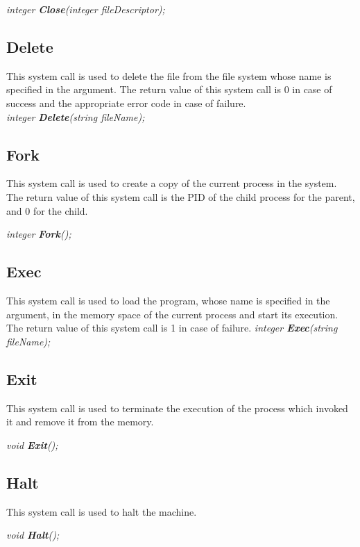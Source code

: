 \documentclass[11pt]{article}
\begin{document}
\textit{integer \textbf{Close}(integer fileDescriptor);}




\subsection{Delete}
This system call is used to delete the file from the file system whose name is specified in the
argument. The return value of this system call is 0 in case of success and the appropriate error code in case
of failure.\\

\textit{integer \textbf{Delete}(string fileName);}



\subsection{Fork}
This system call is used to create a copy of the current process in the system. The return value of this system call is the PID of the child process for the parent, and 0 for the child.


\textit{integer \textbf{Fork}();}




\subsection{Exec}
This system call is used to load the program, whose name is specified in the argument, in the
memory space of the current process and start its execution. The return value of this system call is 1 in case of failure.
\textit{integer \textbf{Exec}(string fileName);}




\subsection{Exit}
This system call is used to terminate the execution of the process which invoked it and remove it from the memory.

\textit{void \textbf{Exit}();}


\subsection{Halt}
This system call is used to halt the machine.

\textit{void \textbf{Halt}();}
\end{document}
